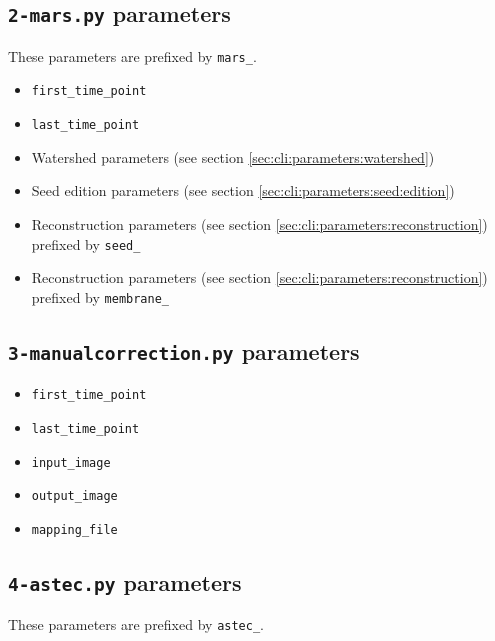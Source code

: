 \subsection{\texttt{2-mars.py} parameters}
\label{sec:cli:parameters:mars}

These parameters are prefixed by \texttt{mars\_}.
 
\begin{itemize}
\itemsep -0.5ex
\item \texttt{first\_time\_point}
\item \texttt{last\_time\_point}
\item Watershed parameters 
  (see section \ref{sec:cli:parameters:watershed})
\item Seed edition parameters
  (see section \ref{sec:cli:parameters:seed:edition})
\item Reconstruction parameters
  (see section \ref{sec:cli:parameters:reconstruction})
  prefixed by \texttt{seed\_}
\item Reconstruction parameters
  (see section \ref{sec:cli:parameters:reconstruction})
  prefixed by \texttt{membrane\_}
\end{itemize}


\subsection{\texttt{3-manualcorrection.py} parameters}
\label{sec:cli:parameters:manualcorrection}

\begin{itemize}
\itemsep -0.5ex
\item \texttt{first\_time\_point}
\item \texttt{last\_time\_point}
\item \texttt{input\_image}
\item \texttt{output\_image}
\item \texttt{mapping\_file}
\end{itemize}

\subsection{\texttt{4-astec.py} parameters}
\label{sec:cli:parameters:astec}


These parameters are prefixed by \texttt{astec\_}.
 
